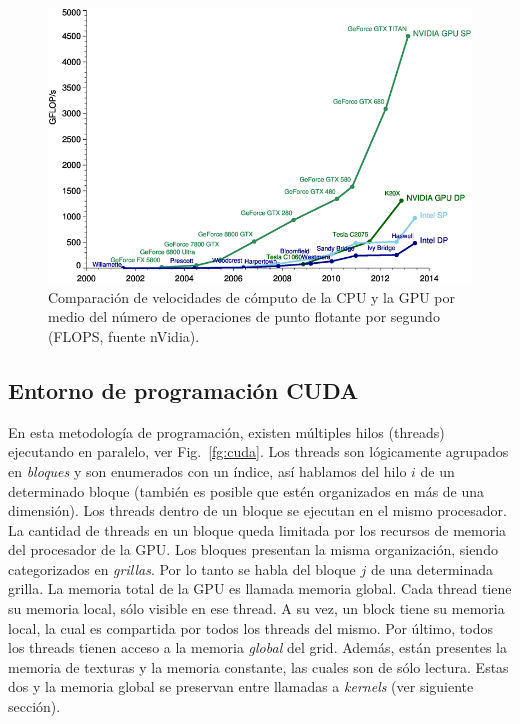\begin{figure}[h]
\begin{center}
\includegraphics[width=12cm]{figures/cpugpu}
\end{center}
\caption[Comparación de velocidades de cómputo de la CPU y la GPU]{Comparación de velocidades de cómputo de la CPU y la GPU por medio del número de operaciones de punto flotante por segundo (FLOPS, fuente nVidia).}
\label{fg:cpugpu}
\end{figure}



\subsection{Entorno de programación CUDA}
En esta metodolog\'ia de programaci\'on, existen m\'ultiples hilos (threads) ejecutando en paralelo, ver Fig.~\ref{fg:cuda}.
Los threads son l\'ogicamente agrupados en {\em bloques} y son enumerados con un \'indice, as\'i hablamos del hilo $i$ de un determinado bloque (también es posible que estén organizados en más de una dimensión).
Los threads dentro de un bloque se ejecutan en el mismo procesador.
La cantidad de threads en un bloque queda limitada por los recursos de memoria del procesador de la GPU. Los bloques presentan la misma organizaci\'on, siendo categorizados en {\em grillas}. 
Por lo tanto se habla del bloque $j$ de una determinada grilla.
La memoria total de la GPU es llamada memoria global. Cada thread tiene su memoria local, s\'olo visible en ese thread.
A su vez, un block tiene su memoria local, la cual es compartida por todos los threads del mismo.
Por \'ultimo, todos los threads tienen acceso a la memoria {\em global} del grid.
Adem\'as, est\'an presentes la memoria de texturas y la memoria constante, las cuales son de s\'olo lectura.
Estas dos y la memoria global se preservan entre llamadas a {\em kernels} (ver siguiente secci\'on).

